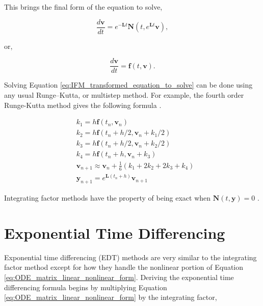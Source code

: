 \noindent
This brings the final form of the equation to solve, 

\begin{equation}
    \frac{d\boldsymbol{v}}{dt} = e^{-\boldsymbol{L}t}\boldsymbol{N}(t,e^{\boldsymbol{L}t}\boldsymbol{v}), 
\end{equation}{}

\noindent
or, 

\begin{equation}
    \frac{d\boldsymbol{v}}{dt} = \boldsymbol{f}(t,\boldsymbol{v}).
    \label{eq:IFM_transformed_equation_to_solve}
\end{equation}{}

Solving Equation \ref{eq:IFM_transformed_equation_to_solve} can be done using any usual Runge–Kutta, or multistep method. For example, the fourth order Runge-Kutta method gives the following formula \cite{Kassam2005}.


\begin{equation}
\begin{split}
    & k_{1} = h\boldsymbol{f}(t_{n},\boldsymbol{v}_{n}) \\
    & k_{2} = h\boldsymbol{f}(t_{n}+h/2, \boldsymbol{v}_{n} + k_{1}/2) \\
    & k_{3} = h\boldsymbol{f}(t_{n}+h/2, \boldsymbol{v}_{n} + k_{2}/2) \\
    & k_{4} = h\boldsymbol{f}(t_{n}+h, \boldsymbol{v}_{n} + k_{3}) \\
    & \boldsymbol{v}_{n+1} \approx \boldsymbol{v}_{n} + \frac{1}{6}(k_{1} + 2k_{2} + 2k_{3} + k_{4}) \\
    & \boldsymbol{y}_{n+1} = e^{\boldsymbol{L} (t_{n}+h)}\boldsymbol{v}_{n+1}
\end{split}
\end{equation}{}

Integrating factor methods have the property of being exact when $\boldsymbol{N}(t,\boldsymbol{y}) = 0$ \cite{ash2009}. 

\section{Exponential Time Differencing}
Exponential time differencing (EDT) methods are very similar to the integrating factor method except for how they handle the nonlinear portion of Equation \ref{eq:ODE_matrix_linear_nonlinear_form}. Deriving the exponential time differencing formula begins by multiplying Equation \ref{eq:ODE_matrix_linear_nonlinear_form} by the integrating factor,

